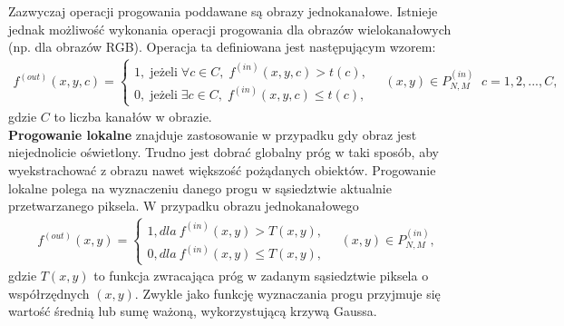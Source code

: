 Zazwyczaj operacji progowania poddawane są obrazy jednokanałowe. Istnieje jednak możliwość wykonania operacji progowania dla obrazów wielokanałowych (np. dla obrazów RGB). Operacja ta definiowana jest następującym wzorem:
\begin{gather*}
  f^{(out)}(x, y, c) = \left\{\begin{matrix}
  1, \; \text{jeżeli} \; \forall c \in C, \; f^{(in)}(x, y, c) > t(c),\\
  0, \; \text{jeżeli} \; \exists c \in C, \; f^{(in)}(x, y, c) \leq t(c),
  \end{matrix}\right. \quad (x, y) \in P^{(in)}_{N,M} \;\; c=1,2,...,C,
\end{gather*}
gdzie $C$ to liczba kanałów w obrazie. \\

\textbf{Progowanie lokalne} znajduje zastosowanie w przypadku gdy obraz jest niejednolicie oświetlony. Trudno jest dobrać globalny próg w taki sposób, aby wyekstrachować z obrazu nawet większość pożądanych obiektów. Progowanie lokalne polega na wyznaczeniu danego progu w sąsiedztwie aktualnie przetwarzanego piksela. W przypadku obrazu jednokanałowego
\begin{gather*}
  f^{(out)}(x, y) = \left\{\begin{matrix}
  1, dla \: f^{(in)}(x, y) > T(x, y),\\
  0, dla \: f^{(in)}(x, y) \leq T(x, y),
  \end{matrix}\right. \quad (x, y) \in P^{(in)}_{N,M},
\end{gather*}
gdzie $T(x, y)$ to funkcja zwracająca próg w zadanym sąsiedztwie piksela o współrzędnych $(x, y)$. Zwykle jako funkcję wyznaczania progu przyjmuje się wartość średnią lub sumę ważoną, wykorzystującą krzywą Gaussa.

